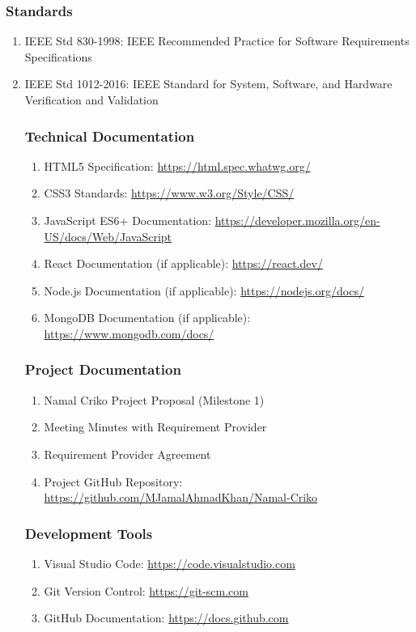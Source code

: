 \documentclass[12pt,a4paper]{article}
\begin{document}
\subsubsection{Standards}
\begin{enumerate}
    \item IEEE Std 830-1998: IEEE Recommended Practice for Software Requirements Specifications
    \item IEEE Std 1012-2016: IEEE Standard for System, Software, and Hardware Verification and Validation
\subsubsection{Technical Documentation}
\begin{enumerate}
    \item HTML5 Specification: \url{https://html.spec.whatwg.org/}
    \item CSS3 Standards: \url{https://www.w3.org/Style/CSS/}
    \item JavaScript ES6+ Documentation: \url{https://developer.mozilla.org/en-US/docs/Web/JavaScript}
    \item React Documentation (if applicable): \url{https://react.dev/}
    \item Node.js Documentation (if applicable): \url{https://nodejs.org/docs/}
    \item MongoDB Documentation (if applicable): \url{https://www.mongodb.com/docs/}
\end{enumerate}

\subsubsection{Project Documentation}
\begin{enumerate}
    \item Namal Criko Project Proposal (Milestone 1)
    \item Meeting Minutes with Requirement Provider
    \item Requirement Provider Agreement
    \item Project GitHub Repository: \url{https://github.com/MJamalAhmadKhan/Namal-Criko}
\end{enumerate}

\subsubsection{Development Tools}
\begin{enumerate}
    \item Visual Studio Code: \url{https://code.visualstudio.com}
    \item Git Version Control: \url{https://git-scm.com}
    \item GitHub Documentation: \url{https://docs.github.com}
\end{enumerate}


\end{enumerate}
\end{document}
